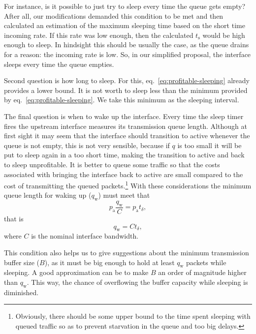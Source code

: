 \documentclass[conference,english]{IEEEtran}
\begin{document}
For instance, is it possible to just try to sleep every time the queue gets
empty? After all, our modifications demanded this condition to be met and then
calculated an estimation of the maximum sleeping time based on the short time
incoming rate. If this rate was low enough, then the calculated $t_{\mathrm{s}}$
would be high enough to sleep. In hindsight this should be usually the case,
as the queue drains for a reason: the incoming rate is low. So, in our
simplified proposal, the interface sleeps every time the queue empties.

Second question is how long to sleep. For this,
eq.~\eqref{eq:profitable-sleeping} already provides a lower bound. It is not
worth to sleep less than the minimum provided by
eq.~\eqref{eq:profitable-sleeping}. We take this minimum as the sleeping
interval.

The final question is when to wake up the interface. Every time the sleep
timer fires the upstream interface measures its transmission queue length.
Although at first sight it may seem that the interface should transition to
active whenever the queue is not empty, this is not very sensible, because if
$q$ is too small it will be put to sleep again in a too short time, making the
transition to active and back to sleep unprofitable. It is better to queue
some traffic so that the costs associated with bringing the interface back to
active are small compared to the cost of transmitting the queued
packets.\footnote{Obviously, there should be some upper bound to the time
  spent sleeping with queued traffic so as to prevent starvation in the queue
  and too big delays.} With these considerations the minimum queue length for
waking up ($q_{\mathrm{w}}$) must meet that
\begin{equation}
  \label{eq:qw-min-implicit}
  p_{\mathrm{a}} \frac{q_{\mathrm{w}}}{C} = p_{\mathrm{a}} t_{\delta},
\end{equation}
that is
\begin{equation}
  \label{eq:qw-min-explicit}
  q_{\mathrm{w}} = C t_{\delta},
\end{equation}
where $C$ is the nominal interface bandwidth.

This condition also helps us to give suggestions about the minimum
transmission buffer size ($B$), as it must be big enough to hold at least
$q_{\mathrm{w}}$ packets while sleeping. A good approximation can be to make
$B$ an order of magnitude higher than $q_{\mathrm{w}}$. This way, the chance
of overflowing the buffer capacity while sleeping is diminished.
\end{document}
